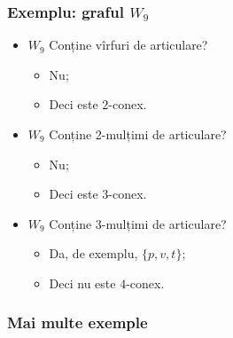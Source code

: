 \begin{frame}
  \frametitle{Exemplu: graful $W_9$}

\begin{minipage}{0.39\textwidth}
\end{minipage}
%
\begin{minipage}{0.59\textwidth}
\begin{itemize}
  \item $W_9$ Conține vîrfuri de articulare?\pause
    \begin{itemize}
      \item Nu;\pause
      \item Deci este $2$-conex.\pause
    \end{itemize}
  \item $W_9$ Conține 2-mulțimi de articulare?\pause
    \begin{itemize}
      \item Nu;\pause
      \item Deci este $3$-conex.\pause
    \end{itemize}
  \item $W_9$ Conține 3-mulțimi de articulare?\pause
    \begin{itemize}
      \item Da, de exemplu, $\{p,v,t\}$;\pause
      \item Deci nu este $4$-conex.
    \end{itemize}
\end{itemize}

\end{minipage}

\end{frame}
  \frametitle{Mai multe exemple}

